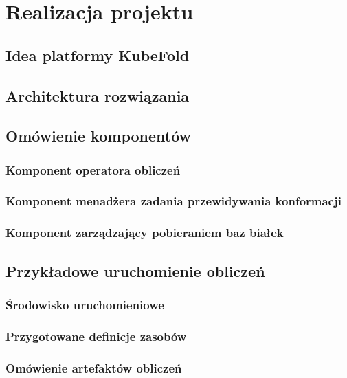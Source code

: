 \chapter{Realizacja projektu}


\section{Idea platformy KubeFold}


\section{Architektura rozwiązania}


\section{Omówienie komponentów}

\subsection{Komponent operatora obliczeń}

\subsection{Komponent menadżera zadania przewidywania konformacji}

\subsection{Komponent zarządzający pobieraniem baz białek}


\section{Przykładowe uruchomienie obliczeń}

\subsection{Środowisko uruchomieniowe}

\subsection{Przygotowane definicje zasobów}

\subsection{Omówienie artefaktów obliczeń}